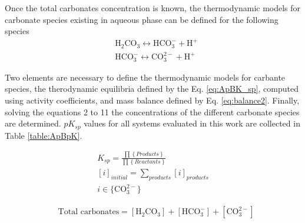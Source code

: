\begin{refsection}[referencesCh3]
Once the total carbonates concentration is known, the thermodynamic models for carbonate species existing in aqueous phase can be defined for the following species
\begin{align*}
& \text{H}_{2}\text{CO}_{3} \leftrightarrow \text{HCO}_{3}^{-} + \text{H}^{+} \\ 
& \text{HCO}_{3}^{-} \leftrightarrow \text{CO}_{3}^{2-} + \text{H}^{+}
\end{align*}

Two elements are necessary to define the thermodynamic models for carbante species, the therodynamic equilibria defined by the Eq. \ref{eq:ApBK_sp}, computed using activity coefficients, and mass balance defined by Eq. \ref{eq:balance2}. Finally, solving the equations 2 to 11 the concentrations of the different carbonate species are determined. $pK_{sp}$ values for all systems evaluated in this work are collected in Table \ref{table:ApBpK}.

\begin{align} \label{eq:ApBK_sp}
& K_{sp} = \frac{ \prod \left\{ Products \right\} }{ \prod \left\{ Reactants \right\}  }&
\\
& \left[ i \right]_{initial} =  \sum_{products} \left[i\right]_{products} \label{eq:ApBbalance1}&
\\
& i \in \bigl\{{\text{CO}_{3}^{2-}} \bigr\}  \nonumber&
\end{align}

\begin{align} \label{eq:balance2}
& \text{Total carbonates} = \left[  \text{H}_{2}\text{CO}_{3}\right] + \left[ \text{HCO}_{3}^{-}\right] + \left[ \text{CO}_{3}^{2-}\right]
\end{align}


\end{refsection}
